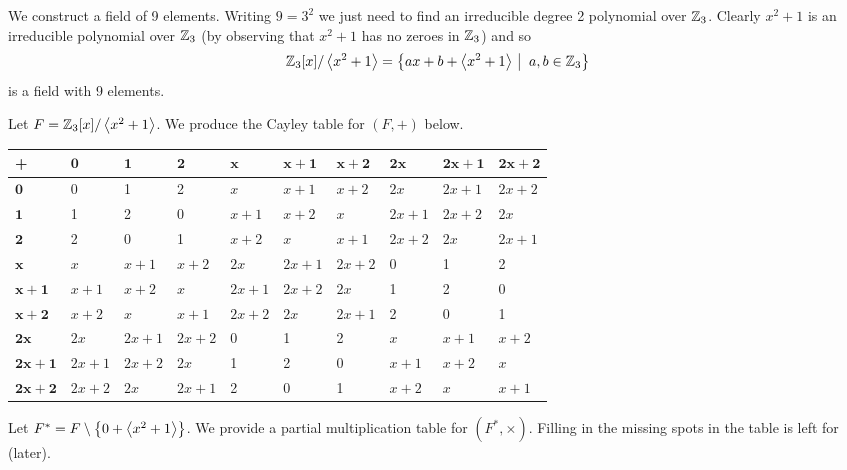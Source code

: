 \begin{example}\label{example-Z3/<x^2+1>}
    We construct a field of 9 elements. Writing $9 = 3^2$ we just need to find an irreducible degree 2 polynomial over $\mathbb{Z}_3$. Clearly $x^2 + 1$ is an irreducible polynomial over $\mathbb{Z}_3$ (by observing that $x^2 + 1$ has no zeroes in $\mathbb{Z}_3$) and so
    \[
        \Z_3[x]/\princ{x^2+1} = \left\{ax+b + \princ{x^2+1} \vert a,b \in \Z_3\right\}
    \]
    is a field with 9 elements.

    

    Let $F = \mathbb{Z}_3[x]/\left\langle x^2+1\right\rangle$. We produce the Cayley table for $(F, +)$ below.
    \begin{table}[H]
        \centering
        \fontsize{9pt}{12pt}\selectfont
        \begin{tabular}{|l|l|l|l|l|l|l|l|l|l|}
            \hline
            \textbf{+} & $\boldsymbol{0}$ & $\boldsymbol{1}$ & $\boldsymbol{2}$ & $\boldsymbol{x}$ & $\boldsymbol{x+1}$ & $\boldsymbol{x+2}$ & $\boldsymbol{2x}$ & $\boldsymbol{2x+1}$ & $\boldsymbol{2x+2}$ \\ \hline
            $\boldsymbol{0}$ & 0 & 1 & 2 & $x$ & $x+1$ & $x+2$ & $2x$ & $2x+1$ & $2x+2$ \\ \hline
            $\boldsymbol{1}$ & 1 & 2 & 0 & $x+1$ & $x+2$ & $x$ & $2x+1$ & $2x+2$ & $2x$ \\ \hline
            $\boldsymbol{2}$ & 2 & 0 & 1 & $x+2$ & $x$ & $x+1$ & $2x+2$ & $2x$ & $2x+1$ \\ \hline
            $\boldsymbol{x}$ & $x$ & $x+1$ & $x+2$ & $2x$ & $2x+1$ & $2x+2$ & 0 & 1 & 2 \\ \hline
            $\boldsymbol{x+1}$ & $x+1$ & $x+2$ & $x$ & $2x+1$ & $2x+2$ & $2x$ & 1 & 2 & 0 \\ \hline
            $\boldsymbol{x+2}$ & $x+2$ & $x$ & $x+1$ & $2x+2$ & $2x$ & $2x+1$ & 2 & 0 & 1 \\ \hline
            $\boldsymbol{2x}$ & $2x$ & $2x+1$ & $2x+2$ & 0 & 1 & 2 & $x$ & $x+1$ & $x+2$ \\ \hline
            $\boldsymbol{2x+1}$ & $2x+1$ & $2x+2$ & $2x$ & 1 & 2 & 0 & $x+1$ & $x+2$ & $x$ \\ \hline
            $\boldsymbol{2x+2}$ & $2x+2$ & $2x$ & $2x+1$ & 2 & 0 & 1 & $x+2$ & $x$ & $x+1$ \\ \hline
        \end{tabular}
    \end{table}

    Let $F^\ast = F \setminus \left\{0 + \left\langle x^2+1\right\rangle\right\}$. We provide a partial multiplication table for $(F^\ast, \times)$. Filling in the missing spots in the table is left for  (later).


\end{example}
